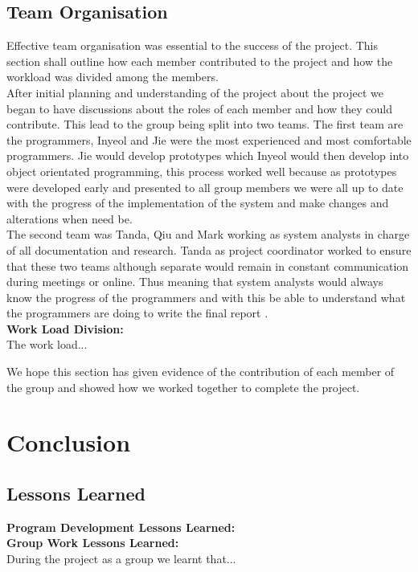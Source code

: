 \documentclass[11pt]{article}
\begin{document}
	\subsection{Team Organisation} %
	Effective team organisation was essential to the success of the project. This section shall outline how each member contributed to the project and how the workload was divided among the members. \\
	After initial planning and understanding of the project about the project we began to have discussions about the roles of each member and how they could contribute. This lead to the group being split into two teams. The first team are the programmers, Inyeol and Jie were the most experienced and most comfortable programmers. Jie would develop prototypes which Inyeol would then develop into object orientated programming, this process worked well because as prototypes were developed early and presented to all group members we were all up to date with the progress of the implementation of the system and make changes and alterations when need be. \\
The second team was Tanda, Qiu and Mark working as system analysts in charge of all documentation and research. Tanda as project coordinator worked to ensure that these two teams although separate would remain in constant communication during meetings or online. Thus meaning that system analysts would always know the progress of the programmers and with this be able to understand what the programmers are doing to write the final report . \\
	\textbf{Work Load Division:}\\ 
	The work load...
	
	We hope this section has given evidence of the contribution of each member of the group and showed how we worked together to complete the project. 
	\section{Conclusion} %
	\subsection{Lessons Learned} 
	\textbf{Program Development Lessons Learned:}\\ %
	
	\textbf{Group Work Lessons Learned:}\\ %
	During the project as a group we learnt that...%
\end{document}
